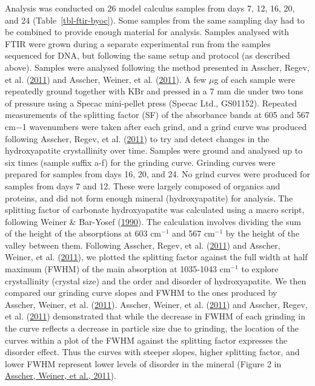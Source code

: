 \documentclass[
  b5paper,
]{book}
\begin{document}
Analysis was conducted on 26 model calculus samples from days 7, 12, 16,
20, and 24 (Table~\ref{tbl-ftir-byoc}). Some samples from the same
sampling day had to be combined to provide enough material for analysis.
Samples analysed with FTIR were grown during a separate experimental run
from the samples sequenced for DNA, but following the same setup and
protocol (as described above). Samples were analysed following the
method presented in Asscher, Regev, et al.
(\protect\hyperlink{ref-asscherAtomicDisorder2011}{2011}) and Asscher,
Weiner, et al.
(\protect\hyperlink{ref-asscherVariationsAtomic2011}{2011}). A few
\(\mu\)g of each sample were repeatedly ground together with KBr and
pressed in a 7 mm die under two tons of pressure using a Specac
mini-pellet press (Specac Ltd., GS01152). Repeated measurements of the
splitting factor (SF) of the absorbance bands at 605 and 567 cm−1
wavenumbers were taken after each grind, and a grind curve was produced
following Asscher, Regev, et al.
(\protect\hyperlink{ref-asscherAtomicDisorder2011}{2011}) to try and
detect changes in the hydroxyapatite crystallinity over time. Samples
were ground and analysed up to six times (sample suffix a-f) for the
grinding curve. Grinding curves were prepared for samples from days 16,
20, and 24. No grind curves were produced for samples from days 7 and
12. These were largely composed of organics and proteins, and did not
form enough mineral (hydroxyapatite) for analysis. The splitting factor
of carbonate hydroxyapatite was calculated using a macro script,
following Weiner \& Bar-Yosef
(\protect\hyperlink{ref-weinerStatesPreservation1990}{1990}). The
calculation involves dividing the sum of the height of the absorptions
at 603 cm\(^{-1}\) and 567 cm\(^{-1}\) by the height of the valley
between them. Following Asscher, Regev, et al.
(\protect\hyperlink{ref-asscherAtomicDisorder2011}{2011}) and Asscher,
Weiner, et al.
(\protect\hyperlink{ref-asscherVariationsAtomic2011}{2011}), we plotted
the splitting factor against the full width at half maximum (FWHM) of
the main absorption at 1035-1043 cm\(^{-1}\) to explore crystallinity
(crystal size) and the order and disorder of hydroxyapatite. We then
compared our grinding curve slopes and FWHM to the ones produced by
Asscher, Weiner, et al.
(\protect\hyperlink{ref-asscherVariationsAtomic2011}{2011}). Asscher,
Weiner, et al.
(\protect\hyperlink{ref-asscherVariationsAtomic2011}{2011}) and Asscher,
Regev, et al. (\protect\hyperlink{ref-asscherAtomicDisorder2011}{2011})
demonstrated that while the decrease in FWHM of each grinding in the
curve reflects a decrease in particle size due to grinding, the location
of the curves within a plot of the FWHM against the splitting factor
expresses the disorder effect. Thus the curves with steeper slopes,
higher splitting factor, and lower FWHM represent lower levels of
disorder in the mineral (Figure 2 in
\protect\hyperlink{ref-asscherVariationsAtomic2011}{Asscher, Weiner, et
al., 2011}).
\end{document}
